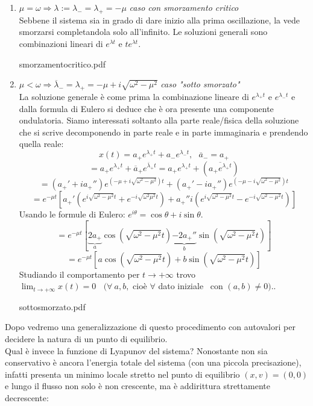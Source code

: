 \documentclass[Main.tex]{subfiles}
\begin{document}
\begin{tema}
\begin{enumerate}
 	\item $\mu = \omega \Rightarrow \lambda :=\lambda_- = \lambda_+=-\mu$ \textit{ caso con smorzamento critico}\\
 	Sebbene il sistema sia in grado di dare inizio alla prima oscillazione, la vede smorzarsi completandola solo all'infinito. Le soluzioni generali sono combinazioni lineari di $e^{\lambda t}$ e $te^{\lambda t}$.
 	\begin{immagine}
 	{smorzamentocritico.pdf}{}
 	\end{immagine}
 	\item $\mu< \omega \Rightarrow \overline \lambda_- = \lambda_+ = -\mu + i \sqrt{\omega^2 - \mu ^2}$ \textit{caso "sotto smorzato"}\\
 	La soluzione generale è come prima la combinazione lineare di $e^{\lambda_+ t}$ e $e^{\lambda_- t}$ e dalla formula di Eulero si deduce che è ora presente una componente ondulatoria. Siamo interessati soltanto alla parte reale/fisica della soluzione che si scrive decomponendo in parte reale e in parte immaginaria e prendendo quella reale:
 	$$
 	x(t) = a_+ e^{\lambda_+t} + a_- e ^{\lambda_- t}, \ \ \ \overline a_- =a_+
 	$$
 	$$
	=a_+ e^{\lambda_+t} + \overline{a}_+ e^{\overline{\lambda}_+t} = a_+ e^{\lambda_+ t} + (\overline{a_+ e^{\lambda_+t}})
	$$
	$$
	=(a_+' +i a_+'')e^{(- \mu + i \sqrt{\omega^2 - \mu^2})t} + (a_+' - i a_+'')e^{(- \mu - i \sqrt{\omega^2 - \mu^2})t}
	$$
	$$
	=e^{-\mu t} [ a_+' ( e^{i \sqrt{\omega^2 -\mu ^2 }t} + e^{-i \sqrt{\omega^2 \mu^2}t}) + a_+'' i (e^{i \sqrt{\omega^2 - \mu^2}t}- e^{-i \sqrt{\omega^2 -\mu^2}t})]
	$$
	Usando le formule di Eulero: $e^{i \theta}= \cos \theta + i \sin \theta$.
	$$
	=e^{-\mu t} [\underbrace{2a_+}_a \cos (\sqrt{\omega^2 -\mu^2}t) \underbrace{-2a_+''}_b \sin (\sqrt{\omega^2 -\mu^2}t)]
	$$
	$$
	=e^{-\mu t}[a \cos (\sqrt{\omega^2 -\mu^2}t) + b \sin (\sqrt{\omega^2 -\mu^2}t)]
	$$
	Studiando il comportamento per $t\rightarrow + \infty$ trovo $\lim_{t \rightarrow + \infty} x(t)=0 \ \ \ \  (\forall \ a,b,$ cioè $\forall$ dato iniziale \ con $(a,b) \neq 0 )$..\\
	 \begin{immagine}
 	{sottosmorzato.pdf}{}
 \end{immagine}
 

 \end{enumerate}
Dopo vedremo una generalizzazione di questo procedimento con autovalori per decidere la natura di un punto di equilibrio.\\
Qual è invece la funzione di Lyapunov del sistema? Nonostante non sia conservativo è ancora l'energia totale del sistema (con una piccola precisazione), infatti presenta un minimo locale stretto nel punto di equilibrio $(x,v)=(0,0)$ e lungo il flusso non solo è non crescente, ma è addirittura  strettamente decrescente:


\end{tema}
\end{document}
